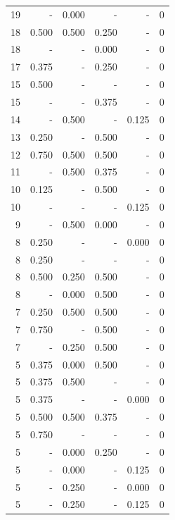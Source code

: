 \documentclass[a4paper]{article}\usepackage[]{graphicx}\usepackage[]{color}
\begin{document}
\begin{table}[ht]
\begin{tabular}{rrrrrr}
  19 & - & 0.000 & - & - & 0 \\ 
   \rowcolor{badColor} 18 & 0.500 & 0.500 & 0.250 & - & 0 \\ 
   \rowcolor{sosoColor} 18 & - & - & 0.000 & - & 0 \\ 
   \rowcolor{sosoColor} 17 & 0.375 & - & 0.250 & - & 0 \\ 
   \rowcolor{nullColor} 15 & 0.500 & - & - & - & 0 \\ 
   \rowcolor{sosoColor} 15 & - & - & 0.375 & - & 0 \\ 
  14 & - & 0.500 & - & 0.125 & 0 \\ 
   \rowcolor{sosoColor} 13 & 0.250 & - & 0.500 & - & 0 \\ 
   \rowcolor{goodColor} 12 & 0.750 & 0.500 & 0.500 & - & 0 \\ 
  11 & - & 0.500 & 0.375 & - & 0 \\ 
   \rowcolor{sosoColor} 10 & 0.125 & - & 0.500 & - & 0 \\ 
   \rowcolor{nullColor} 10 & - & - & - & 0.125 & 0 \\ 
   \rowcolor{badColor} 9 & - & 0.500 & 0.000 & - & 0 \\ 
   \rowcolor{nullColor} 8 & 0.250 & - & - & 0.000 & 0 \\ 
   \rowcolor{nullColor} 8 & 0.250 & - & - & - & 0 \\ 
   \rowcolor{badColor} 8 & 0.500 & 0.250 & 0.500 & - & 0 \\ 
   \rowcolor{badColor} 8 & - & 0.000 & 0.500 & - & 0 \\ 
   \rowcolor{goodColor} 7 & 0.250 & 0.500 & 0.500 & - & 0 \\ 
   \rowcolor{sosoColor} 7 & 0.750 & - & 0.500 & - & 0 \\ 
   \rowcolor{badColor} 7 & - & 0.250 & 0.500 & - & 0 \\ 
   \rowcolor{badColor} 5 & 0.375 & 0.000 & 0.500 & - & 0 \\ 
  5 & 0.375 & 0.500 & - & - & 0 \\ 
   \rowcolor{nullColor} 5 & 0.375 & - & - & 0.000 & 0 \\ 
  5 & 0.500 & 0.500 & 0.375 & - & 0 \\ 
   \rowcolor{nullColor} 5 & 0.750 & - & - & - & 0 \\ 
   \rowcolor{badColor} 5 & - & 0.000 & 0.250 & - & 0 \\ 
  5 & - & 0.000 & - & 0.125 & 0 \\ 
  5 & - & 0.250 & - & 0.000 & 0 \\ 
  5 & - & 0.250 & - & 0.125 & 0 \\ 

\end{tabular}
\end{table}
\end{document}
